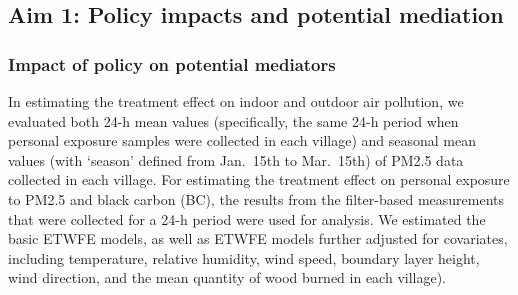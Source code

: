 \documentclass[
  letterpaper,
  DIV=11,
  numbers=noendperiod]{scrartcl}
\begin{document}
\hypertarget{aim-1-policy-impacts-and-potential-mediation}{%
\subsection{Aim 1: Policy impacts and potential
mediation}\label{aim-1-policy-impacts-and-potential-mediation}}

\hypertarget{impact-of-policy-on-potential-mediators}{%
\subsubsection{Impact of policy on potential
mediators}\label{impact-of-policy-on-potential-mediators}}

In estimating the treatment effect on indoor and outdoor air pollution,
we evaluated both 24-h mean values (specifically, the same 24-h period
when personal exposure samples were collected in each village) and
seasonal mean values (with `season' defined from Jan.~15th to Mar.~15th)
of PM2.5 data collected in each village. For estimating the treatment
effect on personal exposure to PM2.5 and black carbon (BC), the results
from the filter-based measurements that were collected for a 24-h period
were used for analysis. We estimated the basic ETWFE models, as well as
ETWFE models further adjusted for covariates, including temperature,
relative humidity, wind speed, boundary layer height, wind direction,
and the mean quantity of wood burned in each village).
\end{document}

